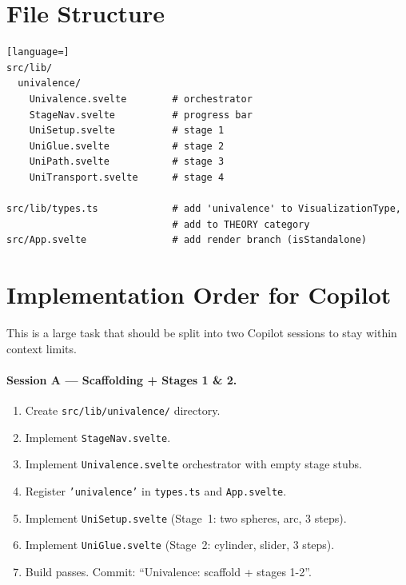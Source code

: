 \documentclass[11pt,a4paper]{article}
\begin{document}
\section{File Structure}

\begin{lstlisting}[language=]
src/lib/
  univalence/
    Univalence.svelte        # orchestrator
    StageNav.svelte          # progress bar
    UniSetup.svelte          # stage 1
    UniGlue.svelte           # stage 2
    UniPath.svelte           # stage 3
    UniTransport.svelte      # stage 4

src/lib/types.ts             # add 'univalence' to VisualizationType,
                             # add to THEORY category
src/App.svelte               # add render branch (isStandalone)
\end{lstlisting}

\section{Implementation Order for Copilot}

This is a large task that should be split into two Copilot sessions to stay
within context limits.

\paragraph{Session A — Scaffolding + Stages 1 \& 2.}
\begin{enumerate}
  \item Create \texttt{src/lib/univalence/} directory.
  \item Implement \texttt{StageNav.svelte}.
  \item Implement \texttt{Univalence.svelte} orchestrator with empty stage stubs.
  \item Register \texttt{'univalence'} in \texttt{types.ts} and \texttt{App.svelte}.
  \item Implement \texttt{UniSetup.svelte} (Stage~1: two spheres, arc, 3 steps).
  \item Implement \texttt{UniGlue.svelte} (Stage~2: cylinder, slider, 3 steps).
  \item Build passes. Commit: ``Univalence: scaffold + stages 1-2''.
\end{enumerate}
\end{document}
